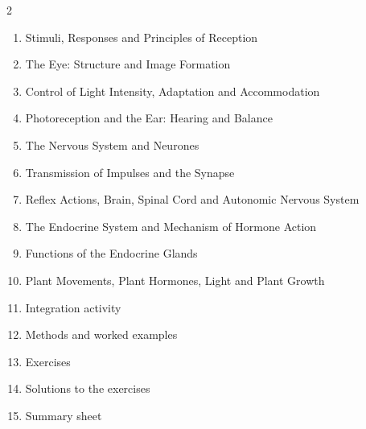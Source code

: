 \documentclass[11pt]{article}
\begin{document}
\begin{sommaire}
\begin{multicols}{2}
\begin{enumerate}
\item Stimuli, Responses and Principles of Reception
\item The Eye: Structure and Image Formation
\item Control of Light Intensity, Adaptation and Accommodation
\item Photoreception and the Ear: Hearing and Balance
\item The Nervous System and Neurones
\item Transmission of Impulses and the Synapse
\item Reflex Actions, Brain, Spinal Cord and Autonomic Nervous System
\item The Endocrine System and Mechanism of Hormone Action
\item Functions of the Endocrine Glands
\item Plant Movements, Plant Hormones, Light and Plant Growth
\item Integration activity
\item Methods and worked examples
\item Exercises
\item Solutions to the exercises
\item Summary sheet
\end{enumerate}
\end{multicols}
\end{sommaire}
\end{document}
